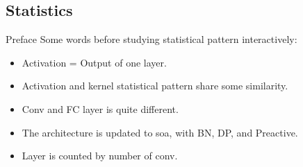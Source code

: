 \documentclass[notes]{beamer}
\begin{document}
\subsection{Statistics}


\begin{frame}{Preface}
Some words before studying statistical pattern interactively:
 \begin{itemize}
 \item Activation = Output of one layer. 
 \item Activation and kernel statistical pattern share some similarity.
 \item Conv and FC layer is quite different. 
 \item The architecture is updated to soa, with BN, DP, and Preactive. 
 \item Layer is counted by number of conv.
 \end{itemize}
\end{frame}
\end{document}
